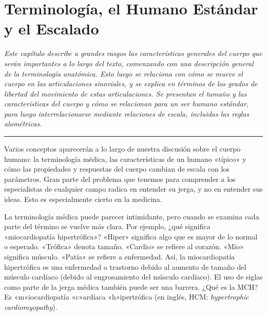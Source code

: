 \documentclass[12pt]{book}
\begin{document}
\setcounter{chapter}{0}

\chapter{Terminología, el Humano Estándar y el Escalado}

\begin{flushleft}
    \textit{Este capítulo describe a grandes rasgos las características generales del cuerpo que serán importantes a lo largo del texto, comenzando con una descripción general de la terminología anatómica. Esto luego se relaciona con cómo se mueve el cuerpo en las articulaciones sinoviales, y se explica en términos de los grados de libertad del movimiento de estas articulaciones. Se presentan el tamaño y las características del cuerpo y cómo se relacionan para un ser humano estándar, para luego interrelacionarse mediante relaciones de escala, incluidas las reglas alométricas.}
\end{flushleft}

\hrule
\vspace{1em}

Varios conceptos aparecerán a lo largo de nuestra discusión sobre el cuerpo humano: la terminología médica, las características de un humano «típico» y cómo las propiedades y respuestas del cuerpo cambian de escala con los parámetros. Gran parte del problema que tenemos para comprender a los especialistas de cualquier campo radica en entender su jerga, y no en entender sus ideas. Esto es especialmente cierto en la medicina.

La terminología médica puede parecer intimidante, pero cuando se examina cada parte del término se vuelve más clara. Por ejemplo, ¿qué significa «miocardiopatía hipertrófica»? «Hiper» significa algo que es mayor de lo normal o esperado. «Trófica» denota tamaño. «Cardio» se refiere al corazón. «Mio» significa músculo. «Patía» se refiere a enfermedad. Así, la miocardiopatía hipertrófica es una enfermedad o trastorno debido al aumento de tamaño del músculo cardíaco (debido al engrosamiento del músculo cardíaco). El uso de siglas como parte de la jerga médica también puede ser una barrera. ¿Qué es la MCH? Es «m»iocardiopatía «c»ardíaca «h»ipertrófica (en inglés, HCM: \textit{hypertrophic cardiomyopathy}).
\end{document}
